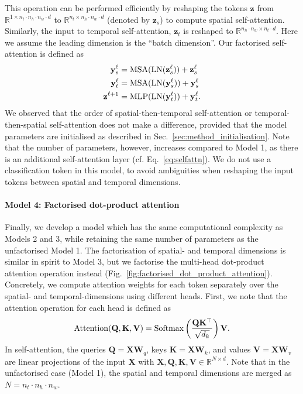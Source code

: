 This operation can be performed efficiently by reshaping the tokens $\mathbf{z}$ from $\mathbb{R}^{1 \times n_t \cdot n_h \cdot n_w \cdot d}$ to $\mathbb{R}^{n_t \times n_h \cdot n_w \cdot d}$ (denoted by $\mathbf{z}_s$) to compute spatial self-attention.
Similarly, the input to temporal self-attention, $\mathbf{z}_t$ is reshaped to $\mathbb{R}^{n_h \cdot n_w \times  n_t \cdot d}$.
Here we assume the leading dimension is the ``batch dimension''.
Our factorised self-attention is defined as
\begin{align}
\mathbf{y}_{s}^{\ell}    &= \operatorname{MSA}(\operatorname{LN}(\mathbf{z}^{\ell}_s)) + \mathbf{z}^{\ell}_s \\
\mathbf{y}_{t}^{\ell}    &= \operatorname{MSA}(\operatorname{LN}(\mathbf{y}^{\ell}_s)) + \mathbf{y}^{\ell}_s  \label{eq:factorised_self_att_temporal} \\
\mathbf{z}^{\ell + 1}  &= \operatorname{MLP}(\operatorname{LN}(\mathbf{y}_t^{\ell})) + \mathbf{y}_t^\ell.
\end{align}
We observed that the order of spatial-then-temporal self-attention or temporal-then-spatial self-attention does not make a difference, provided that the model parameters are initialised as described in Sec.~\ref{sec:method_initialisation}.
Note that the number of parameters, however, increases compared to Model 1, as there is an additional self-attention layer (cf. Eq.~\ref{eq:selfattn}).
We do not use a classification token in this model, to avoid ambiguities when reshaping the input tokens between spatial and temporal dimensions.

\paragraph{Model 4: Factorised dot-product attention}

Finally, we develop a model which has the same computational complexity as Models 2 and 3, while retaining the same number of parameters as the unfactorised Model 1.
The factorisation of spatial- and temporal dimensions is similar in spirit to Model 3, but we factorise the multi-head dot-product attention operation instead (Fig.~\ref{fig:factorised_dot_product_attention}).
Concretely, we compute attention weights for each token separately over the spatial- and temporal-dimensions using different heads.
First, we note that the attention operation for each head is defined as
\begin{align}
\operatorname{Attention}(\mathbf{Q}, \mathbf{K}, \mathbf{V}) = \operatorname{Softmax}\left(\frac{\mathbf{Q} \mathbf{K}^\top}{\sqrt{d_k}} \right) \mathbf{V}. \label{eq:selfattn}
\end{align}
In self-attention, the queries $\mathbf{Q} = \mathbf{X} \mathbf{W}_q$, keys $\mathbf{K} = \mathbf{X} \mathbf{W}_k$, and values $\mathbf{V}= \mathbf{X} \mathbf{W}_v$ are linear projections of the input $\mathbf{X}$ with $\mathbf{X}, \mathbf{Q}, \mathbf{K}, \mathbf{V} \in \mathbb{R}^{N \times d}$. 
Note that in the unfactorised case (Model 1), the spatial and temporal dimensions are merged as $N = n_t \cdot n_h \cdot n_w$.

